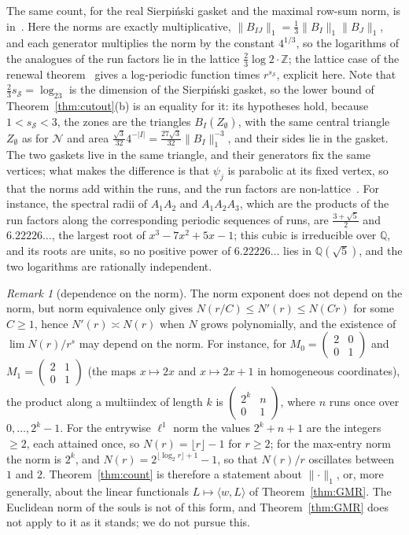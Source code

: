 \documentclass[11pt]{amsart}
\theoremstyle{definition}
\theoremstyle{remark}
\newtheorem{remark}[proposition]{Remark}
\newcommand{\Z}{\mathbb Z}
\newcommand{\cN}{\mathcal N}
\newcommand{\abs}[1]{\lvert #1\rvert}
\newcommand{\norm}[1]{\lVert #1\rVert}
\newcommand{\pr}[1]{\langle #1\rangle}
\begin{document}
The same count, for the real Sierpi\'nski gasket and the maximal row-sum norm, is in~\cite[Motivational Example~3]{DL12}. Here the norms are exactly multiplicative, $\norm{B_{IJ}}_1=\frac13\norm{B_I}_1\norm{B_J}_1$, and each generator multiplies the norm by the constant $4^{1/3}$, so the logarithms of the analogues of the run factors lie in the lattice $\frac23\log2\cdot\Z$; the lattice case of the renewal theorem~\cite[Thm.~3.1(ii)]{KK16} gives a log-periodic function times $r^{s_{\mathcal S}}$, explicit here. Note that $\frac23s_{\mathcal S}=\log_23$ is the dimension of the Sierpi\'nski gasket, so the lower bound of Theorem~\ref{thm:cutout}(b) is an equality for it: its hypotheses hold, because $1<s_{\mathcal S}<3$, the zones are the triangles $B_I(Z_\emptyset)$, with the same central triangle $Z_\emptyset$ as for $\cN$ and area $\frac{\sqrt3}{32}4^{-\abs I}=\frac{27\sqrt3}{32}\norm{B_I}_1^{-3}$, and their sides lie in the gasket. The two gaskets live in the same triangle, and their generators fix the same vertices; what makes the difference is that $\psi_j$ is parabolic at its fixed vertex, so that the norms add within the runs, and the run factors are non-lattice~\cite[Prop.~42]{GMR19}. For instance, the spectral radii of $A_1A_2$ and $A_1A_2A_3$, which are the products of the run factors along the corresponding periodic sequences of runs, are $\frac{3+\sqrt5}2$ and $6.22226\ldots$, the largest root of $x^3-7x^2+5x-1$; this cubic is irreducible over $\mathbb Q$, and its roots are units, so no positive power of $6.22226\ldots$ lies in $\mathbb Q(\sqrt5)$, and the two logarithms are rationally independent.

\begin{remark}[dependence on the norm]\label{rem:norms}
The norm exponent does not depend on the norm, but norm equivalence only gives $N(r/C)\le N'(r)\le N(Cr)$ for some $C\ge1$, hence $N'(r)\asymp N(r)$ when $N$ grows polynomially, and the existence of $\lim N(r)/r^{s}$ may depend on the norm. For instance, for $M_0=\begin{pmatrix}2&0\\0&1\end{pmatrix}$ and $M_1=\begin{pmatrix}2&1\\0&1\end{pmatrix}$ (the maps $x\mapsto2x$ and $x\mapsto2x+1$ in homogeneous coordinates), the product along a multiindex of length $k$ is $\begin{pmatrix}2^k&n\\0&1\end{pmatrix}$, where $n$ runs once over $0,\dots,2^k-1$. For the entrywise $\ell^1$ norm the values $2^k+n+1$ are the integers $\ge2$, each attained once, so $N(r)=\lfloor r\rfloor-1$ for $r\ge2$; for the max-entry norm the norm is $2^k$, and $N(r)=2^{\lfloor\log_2r\rfloor+1}-1$, so that $N(r)/r$ oscillates between $1$ and $2$. Theorem~\ref{thm:count} is therefore a statement about $\norm\cdot_1$, or, more generally, about the linear functionals $L\mapsto\pr{w,L}$ of Theorem~\ref{thm:GMR}. The Euclidean norm of the souls is not of this form, and Theorem~\ref{thm:GMR} does not apply to it as it stands; we do not pursue this.
\end{remark}
\end{document}
